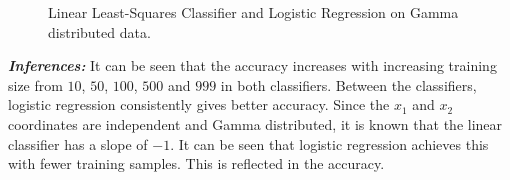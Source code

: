 \documentclass[12pt, a4 paper]{article}
\begin{document}
\begin{figure}

\caption{Linear Least-Squares Classifier and Logistic Regression on Gamma distributed data.}
\label{fig:LS_LOG_Gamma}
\end{figure}

{\it \bfseries Inferences:} It can be seen that the accuracy increases with increasing training size from $10$, $50$, $100$, $500$ and $999$ in both classifiers. Between the classifiers, logistic regression consistently gives better accuracy. Since the $x_{1}$ and $x_{2}$ coordinates are independent and Gamma distributed, it is known that the linear classifier has a slope of $-1$. It can be seen that logistic regression achieves this with fewer training samples. This is reflected in the accuracy. \\
\end{document}
